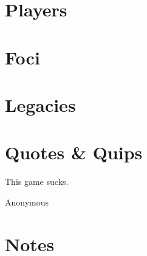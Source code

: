 \documentclass[letterpaper,twoside,openany]{book}
\begin{document}
\appendix

\chapter{Players}

\chapter{Foci}

\chapter{Legacies}

\chapter{Quotes \& Quips}
\epigraph{
	This game sucks.
}{Anonymous}

\chapter{Notes}
\end{document}
